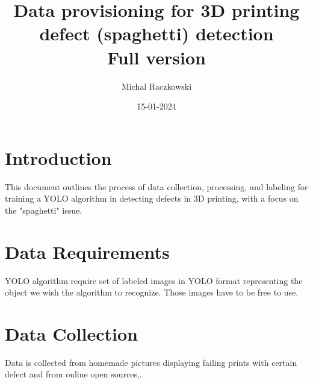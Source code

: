 \documentclass[12pt,a4paper]{article}
\title{{\textbf{Data provisioning for 3D printing defect (spaghetti) detection}\\ {\small Full version}}}
\author{Michal Raczkowski}
\date{15-01-2024}
\begin{document}
\maketitle
\thispagestyle{empty} %

\newpage
\tableofcontents
\newpage

\setcounter{page}{1} %

\section{Introduction}
This document outlines the process of data collection, processing, and labeling for training a YOLO algorithm in detecting defects in 3D printing, with a focus on the "spaghetti" issue.

\section{Data Requirements}
YOLO algorithm require set of labeled images in YOLO format representing the object we wish the algorithm to recognize. Those images have to be free to use.

\section{Data Collection}
Data is collected from homemade pictures displaying failing prints with certain defect and from online open sources\cite{onlineOpenSource1},\cite{onlineOpenSource2}.
\end{document}
